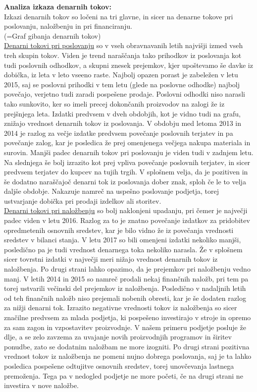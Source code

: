 \documentclass[12pt,a4paper]{amsart}
\theoremstyle{definition} %
\theoremstyle{plain} %
\begin{document}
\textbf{Analiza izkaza denarnih tokov:}\\
Izkazi denarnih tokov so ločeni na tri glavne, in sicer na denarne tokove pri poslovanju, naložbenju in pri financiranju.\\
(=Graf gibanja denarnih tokov)\\
\underline{Denarni tokovi pri poslovanju} so v vseh obravnavanih letih najvišji izmed vseh treh skupin tokov. Viden je trend naraščanja tako prihodkov iz poslovanja kot tudi poslovnih odhodkov, a skupni znesek prejemkov, kjer upoštevamo še davke iz dobička, iz leta v leto vseeno raste. Najbolj opazen porast je zabeležen v letu 2015, saj se poslovni prihodki v tem letu (glede na poslovne odhodke) najbolj povečajo, verjetno tudi zaradi pospešene prodaje. Poslovni odhodki niso narasli tako sunkovito, ker so imeli precej dokončanih proizvodov na zalogi že iz prejšnjega leta. Izdatki predvsem v dveh obdobjih, kot je vidno tudi na grafu, znižajo vrednost denarnih tokov iz poslovanja. V obdobju med letoma 2013 in 2014 je razlog za večje izdatke predvsem povečanje poslovnih terjatev in pa povečanje zalog, kar je posledica že prej omenjenega večjega nakupa materiala in surovin. Manjši padec denarnih tokov pri poslovanju je viden tudi v zadnjem letu. Na slednjega še bolj izrazito kot prej vpliva povečanje poslovnih terjatev, in sicer predvsem terjatev do kupcev na tujih trgih. V splošnem velja, da je pozitiven in še dodatno naraščajoč denarni tok iz poslovanja dober znak, sploh če le to velja daljše obdobje. Nakazuje namreč na uspešno poslovanje podjetja, torej ustvarjanje dobička pri prodaji izdelkov ali storitev.\\
\underline{Denarni tokovi pri naložbenju} so bolj naklonjeni upadanju, pri čemer je največji padec viden v letu 2016. Razlog za to je znatno povečanje izdatkov za pridobitev opredmetenih osnovnih sredstev, kar je bilo vidno že iz povečanja vrednosti sredstev v bilanci stanja. V letu 2017 so bili omenjeni izdatki nekoliko manjši, posledično pa je tudi vrednost denarnega toka nekoliko narasla. Že v splošnem sicer tovrstni izdatki v največji meri nižajo vrednost denarnih tokov iz naložbenja. Po drugi strani lahko opazimo, da je prejemkov pri naložbenju vedno manj. V letih 2014 in 2015 so namreč prodali nekaj finančnih naložb, pri tem pa torej ustvarili večinski del prejemkov iz naložbenja. Posledično v nadaljnih letih od teh finančnih naložb niso prejemali nobenih obresti, kar je še dodaten razlog za nižji denarni tok. Izrazito negativne vrednosti tokov iz naložbenja so sicer značilne predvsem za mlada podjetja, ki pospešeno investirajo v stroje in opremo za sam zagon in vzpostavitev proizvodnje. V našem primeru podjetje posluje že dlje, a se zelo zavzema za uvajanje novih proizvodnjih programov in širitev ponudbe, zato se dodatnim naložbam ne more izogniti. Po drugi strani pozitivna vrednost tokov iz naložbenja ne pomeni nujno dobrega poslovanja, saj je ta lahko posledica pospešene odtujitve osnovnih sredstev, torej unovčevanja lastnega premoženja. Tega pa v nedogled podjetje ne more početi, če na drugi strani ne investira v nove naložbe. \\
\end{document}
